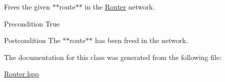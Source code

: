 Frees the given $\ast$$\ast$route$\ast$$\ast$ in the \hyperlink{class_router}{Router} network. 

\begin{DoxyPrecond}{Precondition}
True 
\end{DoxyPrecond}
\begin{DoxyPostcond}{Postcondition}
The $\ast$$\ast$route$\ast$$\ast$ has been freed in the network. 
\end{DoxyPostcond}


The documentation for this class was generated from the following file:\begin{DoxyCompactItemize}
\item 
\hyperlink{_router_8hpp}{Router.hpp}\end{DoxyCompactItemize}
